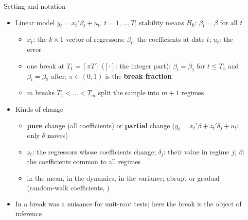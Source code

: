 \begin{frame}{Setting and notation}
\itemsize{\small}
\begin{itemize}
    \item Linear model $y_t = x_t'\beta_t + u_t$, $t = 1, \dots, T$; stability means $H_0$: $\beta_t = \beta$ for all $t$
    \begin{itemize}
        \item $x_t$: the $k \times 1$ vector of regressors; $\beta_t$: the coefficients at date $t$; $u_t$: the error
        \item one break at $T_1 = [\pi T]$ ($[\cdot]$: the integer part): $\beta_t = \beta_1$ for $t \le T_1$ and $\beta_t = \beta_2$ after; $\pi \in (0, 1)$ is the \textbf{break fraction}
        \item $m$ breaks $T_1 < \dots < T_m$ split the sample into $m + 1$ regimes
    \end{itemize}
    \item Kinds of change
    \begin{itemize}
        \item \textbf{pure} change (all coefficients) or \textbf{partial} change ($y_t = x_t'\beta + z_t'\delta_j + u_t$: only $\delta$ moves)
        \item $z_t$: the regressors whose coefficients change; $\delta_j$: their value in regime $j$; $\beta$: the coefficients common to all regimes
        \item in the mean, in the dynamics, in the variance; abrupt or gradual (random-walk coefficients, )
    \end{itemize}
    \item In  a break was a nuisance for unit-root tests; here the break is the object of inference
\end{itemize}
\end{frame}

